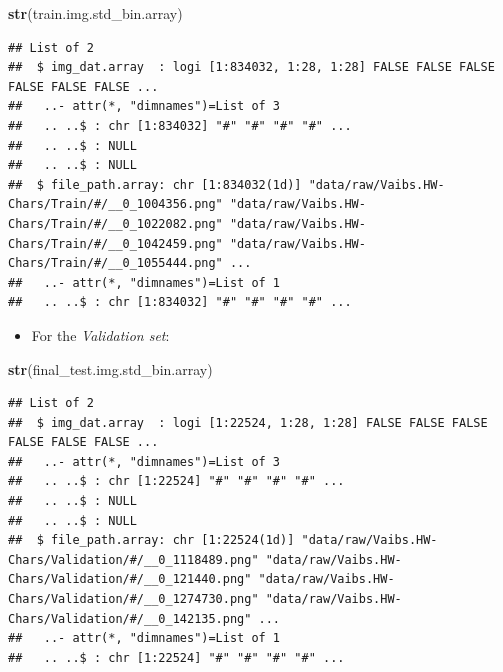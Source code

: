 \documentclass[
]{report}
\newenvironment{Shaded}{\begin{snugshade}}{\end{snugshade}}
\newcommand{\FunctionTok}[1]{\textcolor[rgb]{0.13,0.29,0.53}{\textbf{#1}}}
\newcommand{\NormalTok}[1]{#1}
\providecommand{\tightlist}{%
  \setlength{\itemsep}{0pt}\setlength{\parskip}{0pt}}
\begin{document}
\begin{Shaded}
\begin{Highlighting}[]
\FunctionTok{str}\NormalTok{(train.img.std\_bin.array)}
\end{Highlighting}
\end{Shaded}

\begin{verbatim}
## List of 2
##  $ img_dat.array  : logi [1:834032, 1:28, 1:28] FALSE FALSE FALSE FALSE FALSE FALSE ...
##   ..- attr(*, "dimnames")=List of 3
##   .. ..$ : chr [1:834032] "#" "#" "#" "#" ...
##   .. ..$ : NULL
##   .. ..$ : NULL
##  $ file_path.array: chr [1:834032(1d)] "data/raw/Vaibs.HW-Chars/Train/#/__0_1004356.png" "data/raw/Vaibs.HW-Chars/Train/#/__0_1022082.png" "data/raw/Vaibs.HW-Chars/Train/#/__0_1042459.png" "data/raw/Vaibs.HW-Chars/Train/#/__0_1055444.png" ...
##   ..- attr(*, "dimnames")=List of 1
##   .. ..$ : chr [1:834032] "#" "#" "#" "#" ...
\end{verbatim}

\protect{}\label{validation_set.struct}
\begin{itemize}
\tightlist
\item
  For the \emph{Validation set}:
\end{itemize}

\begin{Shaded}
\begin{Highlighting}[]
\FunctionTok{str}\NormalTok{(final\_test.img.std\_bin.array)}
\end{Highlighting}
\end{Shaded}

\begin{verbatim}
## List of 2
##  $ img_dat.array  : logi [1:22524, 1:28, 1:28] FALSE FALSE FALSE FALSE FALSE FALSE ...
##   ..- attr(*, "dimnames")=List of 3
##   .. ..$ : chr [1:22524] "#" "#" "#" "#" ...
##   .. ..$ : NULL
##   .. ..$ : NULL
##  $ file_path.array: chr [1:22524(1d)] "data/raw/Vaibs.HW-Chars/Validation/#/__0_1118489.png" "data/raw/Vaibs.HW-Chars/Validation/#/__0_121440.png" "data/raw/Vaibs.HW-Chars/Validation/#/__0_1274730.png" "data/raw/Vaibs.HW-Chars/Validation/#/__0_142135.png" ...
##   ..- attr(*, "dimnames")=List of 1
##   .. ..$ : chr [1:22524] "#" "#" "#" "#" ...
\end{verbatim}
\end{document}
